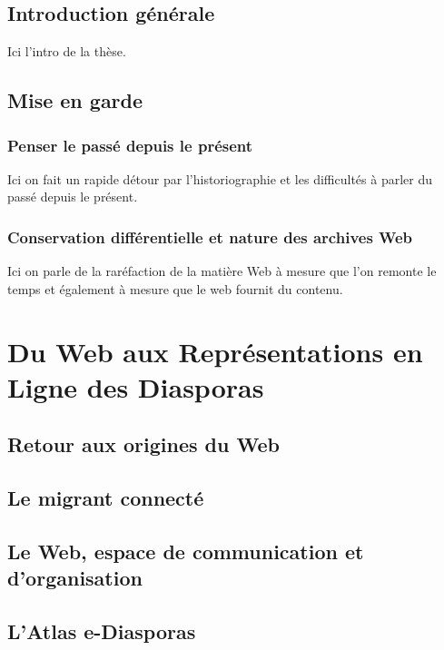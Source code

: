 \documentclass{tufte-book}
\begin{document}
\section{Introduction générale}

Ici l'intro de la thèse.

\section{Mise en garde}

\subsection{Penser le passé depuis le présent}

Ici on fait un rapide détour par l'historiographie et les difficultés à parler du passé depuis le présent.

\subsection{Conservation différentielle et nature des archives Web}

Ici on parle de la raréfaction de la matière Web à mesure que l'on remonte le temps et également à mesure que le web fournit du contenu.


\chapter{Du Web aux Représentations en Ligne des Diasporas}

\section{Retour aux origines du Web}

\section{Le migrant connecté}

\section{Le Web, espace de communication et d'organisation}

\section{L'Atlas e-Diasporas}
\end{document}
